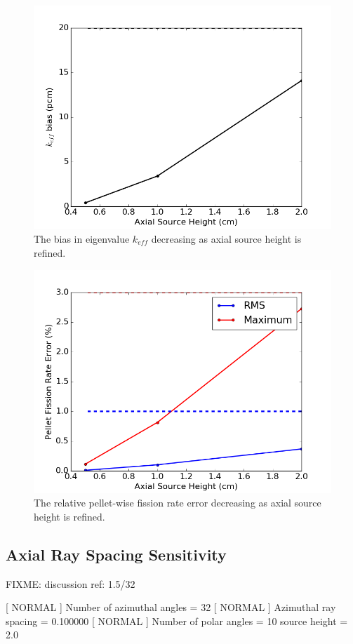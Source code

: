 \begin{figure}[h!]
	\centering
	\includegraphics[width=0.7\linewidth]{figures/results/sensitivity/source_height_pcm.png}
	\caption[]{The bias in eigenvalue $k_{\textit{eff}}$ decreasing as axial source height is refined.}
	\label{fig:axial-sh-pcm}
\end{figure}
\begin{figure}[h!]
	\centering
	\includegraphics[width=0.7\linewidth]{figures/results/sensitivity/source_height_fr.png}
	\caption[]{The relative pellet-wise fission rate error decreasing as axial source height is refined.}
	\label{fig:axial-sh-fr}
\end{figure}

\subsection{Axial Ray Spacing Sensitivity}

FIXME: discussion
ref: 1.5/32

[  NORMAL ]  Number of azimuthal angles = 32
[  NORMAL ]  Azimuthal ray spacing = 0.100000
[  NORMAL ]  Number of polar angles = 10
source height = 2.0



